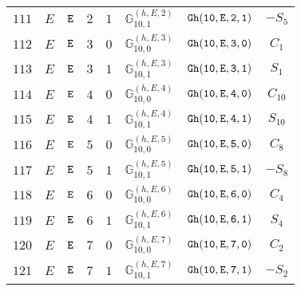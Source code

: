 \documentclass[fleqn,8pt]{jsarticle}
\begin{document}
\begin{table}[ht!]
\begin{center}
\begin{tabular}{cccccccc}
$ 111 $ & $ E $ & $ {\tt E} $ & $ 2 $ & $ 1 $ & $ \mathbb{G}_{10,1}^{(h,E,2)} $ & $ {\tt Gh(10,E,2,1)} $ & $ - S_{5} $ \\
$ 112 $ & $ E $ & $ {\tt E} $ & $ 3 $ & $ 0 $ & $ \mathbb{G}_{10,0}^{(h,E,3)} $ & $ {\tt Gh(10,E,3,0)} $ & $ C_{1} $ \\
$ 113 $ & $ E $ & $ {\tt E} $ & $ 3 $ & $ 1 $ & $ \mathbb{G}_{10,1}^{(h,E,3)} $ & $ {\tt Gh(10,E,3,1)} $ & $ S_{1} $ \\
$ 114 $ & $ E $ & $ {\tt E} $ & $ 4 $ & $ 0 $ & $ \mathbb{G}_{10,0}^{(h,E,4)} $ & $ {\tt Gh(10,E,4,0)} $ & $ C_{10} $ \\
$ 115 $ & $ E $ & $ {\tt E} $ & $ 4 $ & $ 1 $ & $ \mathbb{G}_{10,1}^{(h,E,4)} $ & $ {\tt Gh(10,E,4,1)} $ & $ S_{10} $ \\
$ 116 $ & $ E $ & $ {\tt E} $ & $ 5 $ & $ 0 $ & $ \mathbb{G}_{10,0}^{(h,E,5)} $ & $ {\tt Gh(10,E,5,0)} $ & $ C_{8} $ \\
$ 117 $ & $ E $ & $ {\tt E} $ & $ 5 $ & $ 1 $ & $ \mathbb{G}_{10,1}^{(h,E,5)} $ & $ {\tt Gh(10,E,5,1)} $ & $ - S_{8} $ \\
$ 118 $ & $ E $ & $ {\tt E} $ & $ 6 $ & $ 0 $ & $ \mathbb{G}_{10,0}^{(h,E,6)} $ & $ {\tt Gh(10,E,6,0)} $ & $ C_{4} $ \\
$ 119 $ & $ E $ & $ {\tt E} $ & $ 6 $ & $ 1 $ & $ \mathbb{G}_{10,1}^{(h,E,6)} $ & $ {\tt Gh(10,E,6,1)} $ & $ S_{4} $ \\
$ 120 $ & $ E $ & $ {\tt E} $ & $ 7 $ & $ 0 $ & $ \mathbb{G}_{10,0}^{(h,E,7)} $ & $ {\tt Gh(10,E,7,0)} $ & $ C_{2} $ \\
$ 121 $ & $ E $ & $ {\tt E} $ & $ 7 $ & $ 1 $ & $ \mathbb{G}_{10,1}^{(h,E,7)} $ & $ {\tt Gh(10,E,7,1)} $ & $ - S_{2} $ \\
 \hline \hline
\end{tabular}
\end{center}
\end{table}
\end{document}
